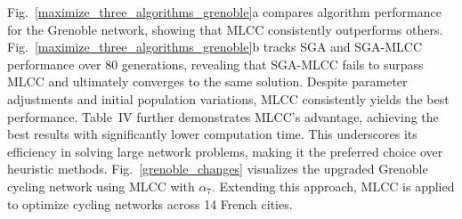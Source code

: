 \documentclass[lettersize,journal]{IEEEtran}
\begin{document}

Fig.~\ref{maximize_three_algorithms_grenoble}a compares algorithm performance for the Grenoble network, showing that MLCC consistently outperforms others. Fig.~\ref{maximize_three_algorithms_grenoble}b tracks SGA and SGA-MLCC performance over 80 generations, revealing that SGA-MLCC fails to surpass MLCC and ultimately converges to the same solution. Despite parameter adjustments and initial population variations, MLCC consistently yields the best performance. Table~IV further demonstrates MLCC’s advantage, achieving the best results with significantly lower computation time. This underscores its efficiency in solving large network problems, making it the preferred choice over heuristic methods. Fig.~\ref{grenoble_changes} visualizes the upgraded Grenoble cycling network using MLCC with $\alpha_7$. Extending this approach, MLCC is applied to optimize cycling networks across 14 French cities.  





\end{document}
